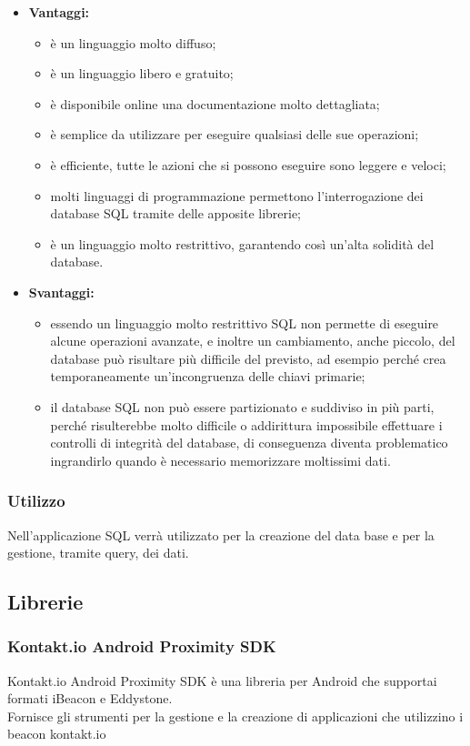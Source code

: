 	\begin{itemize}
		\item \textbf{Vantaggi:}
			\begin{itemize}
				\item è un linguaggio molto diffuso;
				\item è un linguaggio libero e gratuito;
				\item è disponibile online una documentazione molto dettagliata;
				\item è semplice da utilizzare per eseguire qualsiasi delle sue operazioni;
				\item è efficiente, tutte le azioni che si possono eseguire sono leggere e veloci;
				\item molti linguaggi di programmazione permettono l'interrogazione dei database SQL tramite delle apposite librerie;
				\item è un linguaggio molto restrittivo, garantendo così un'alta solidità del database.
			\end{itemize}
		\item \textbf{Svantaggi:}
			\begin{itemize}
				\item essendo un linguaggio molto restrittivo SQL non permette di eseguire alcune operazioni avanzate, e inoltre un cambiamento, anche piccolo, del database può risultare più difficile del previsto, ad esempio perché crea temporaneamente un'incongruenza delle chiavi primarie;
				\item il database SQL non può essere partizionato e suddiviso in più parti, perché risulterebbe molto difficile o addirittura impossibile effettuare i controlli di integrità del database, di conseguenza diventa problematico ingrandirlo quando è necessario memorizzare moltissimi dati.
			\end{itemize}
	\end{itemize}
	\subsubsection{Utilizzo}
	Nell'applicazione SQL verrà utilizzato per la creazione del data base e per la gestione, tramite query, dei dati.

\subsection{Librerie}
\subsubsection{Kontakt.io Android Proximity SDK}
	Kontakt.io Android Proximity SDK è una libreria per Android che supportai formati iBeacon e Eddystone.\\
	Fornisce gli strumenti per la gestione e la creazione di applicazioni che utilizzino i beacon kontakt.io

